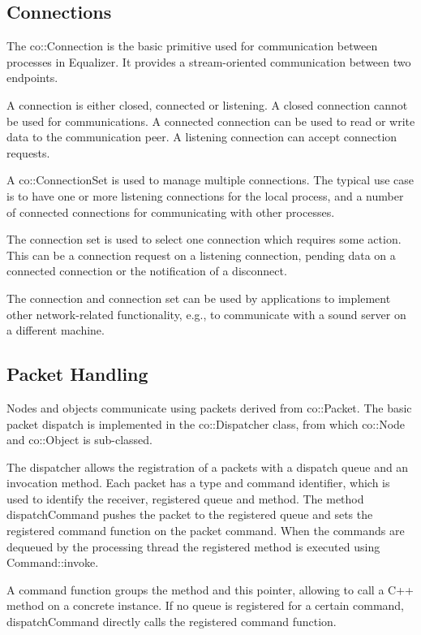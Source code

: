 \documentclass[10pt,a4]{scrartcl}
\begin{document}
\subsection{Connections}

The \textsf{co::Connection} is the basic primitive used for communication
between processes in Equalizer. It provides a stream-oriented communication
between two endpoints.

A connection is either closed, connected or listening. A closed connection
cannot be used for communications. A connected connection can be used to read or
write data to the communication peer. A listening connection can accept
connection requests.

A \textsf{co::ConnectionSet} is used to manage multiple connections. The
typical use case is to have one or more listening connections for the local
process, and a number of connected connections for communicating with other
processes.

The connection set is used to select one connection which requires some
action. This can be a connection request on a listening connection, pending data
on a connected connection or the notification of a disconnect.

The connection and connection set can be used by applications to implement other
network-related functionality, e.g., to communicate with a sound server on a
different machine.


\subsection{Packet Handling}

Nodes and objects communicate using packets derived from
\textsf{co::Packet}. The basic packet dispatch is implemented in the
\textsf{co::Dispatcher} class, from which \textsf{co::Node} and \textsf{co::Object} is sub-classed.

The dispatcher allows the registration of a packets with a dispatch queue and an
invocation method. Each packet has a type and command identifier, which is used
to identify the receiver, registered queue and method. The method
\textsf{dispatchCommand} pushes the packet to the registered queue and sets the
registered command function on the packet command. When the
commands are dequeued by the processing thread the registered method is executed
using \textsf{Command::invoke}.

A command function groups the method and \textsf{this} pointer, allowing
to call a C++ method on a concrete instance. If no queue is registered
for a certain command, \textsf{dispatchCommand} directly calls the
registered command function.
\end{document}
